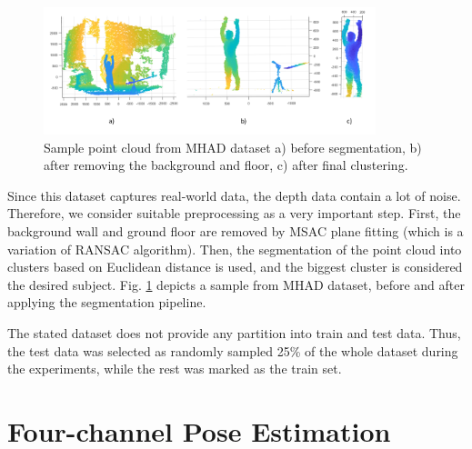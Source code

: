 \begin{figure}[H]
\begin{center}
  \includegraphics[height=140px]{images/implementation/mhad.png}
  \caption[Sample point cloud from MHAD dataset \cite{Vidal:2013:BMC:2478277.2478412}.]{ Sample point cloud from MHAD dataset \cite{Vidal:2013:BMC:2478277.2478412} a) before segmentation, b) after removing the background and floor, c) after final clustering.}
  \label{fig:mhad}
\end{center}
\end{figure}

\noindent
Since this dataset captures real-world data, the depth data contain a lot of noise. Therefore, we consider suitable preprocessing as a very important step. First, the background wall and ground floor are removed by MSAC plane fitting (which is a variation of RANSAC algorithm). Then, the segmentation of the point cloud into clusters based on Euclidean distance is used, and the biggest cluster is considered the desired subject. Fig. \ref{fig:mhad} depicts a sample from MHAD dataset, before and after applying the segmentation pipeline.\par

\vspace{5mm}
\noindent
The stated dataset does not provide any partition into train and test data. Thus, the test data was selected as randomly sampled 25\% of the whole dataset during the experiments, while the rest was marked as the train set.


 \section{Four-channel Pose Estimation}

